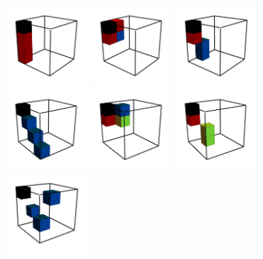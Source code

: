 \documentclass[11pt,dvipsnames]{article} %
\newcommand{\1}{\mathds{1}}
\begin{document}
\begin{figure}[H]
	\centering
	\hfill \hfill
	\includegraphics[height=3cm]{img/3q-4c-si-1}
	\hfill
	\includegraphics[height=3cm]{img/3q-4c-si-2}
	\hfill
	\includegraphics[height=3cm]{img/3q-4c-si-3}
	\hfill
	\includegraphics[height=3cm]{img/3q-4c-si-4}
	\hfill
	\includegraphics[height=3cm]{img/3q-4c-si-5}
	\hfill
	\vfill
	\hfill
	\includegraphics[height=3cm]{img/3q-4c-no-1}
	\hfill
	\includegraphics[height=3cm]{img/3q-4c-no-2}

\end{figure}
\end{document}
